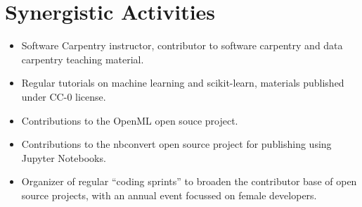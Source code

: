 \section*{Synergistic Activities}
\begin{itemize}
\item Software Carpentry instructor, contributor to software carpentry and data
    carpentry teaching material.
\item Regular tutorials on machine learning and scikit-learn, materials published under CC-0 license.
\item Contributions to the OpenML open souce project.
\item Contributions to the nbconvert open source project for publishing using Jupyter Notebooks.
\item Organizer of regular ``coding sprints'' to broaden the contributor base of open source projects, with an annual event focussed on female developers.
\end{itemize}
